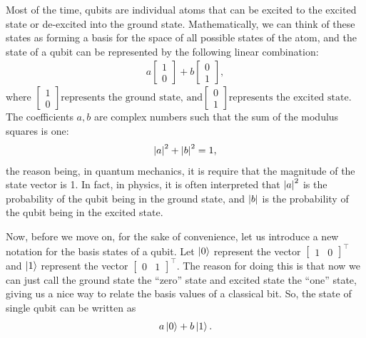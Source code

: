 \documentclass[a4paper,11pt]{article}
\numberwithin{equation}{section}
\theoremstyle{definition}
\begin{document}
Most of the time, qubits are individual atoms that can be excited to the excited state or de-excited into the ground state. Mathematically, we can think of these states as forming a basis for the space of all possible states of the atom, and the state of a qubit can be represented by the following linear combination:
\begin{align*}
a\begin{bmatrix}
1\\0
\end{bmatrix}
+
b\begin{bmatrix}
0\\1
\end{bmatrix},
\end{align*} 
where 
$
\begin{bmatrix}
1\\0
\end{bmatrix} \text{represents the ground state, and}
\begin{bmatrix}
0\\1
\end{bmatrix} \text{represents the excited state}
$. The coefficients $a,b$ are complex numbers such that the sum of the modulus squares is one:
\begin{align*}
\abs{a}^2 + \abs{b}^2 = 1,
\end{align*}
the reason being, in quantum mechanics, it is require that the magnitude of the state vector is 1. In fact, in physics, it is often interpreted that $\abs{a}^2$ is the probability of the qubit being in the ground state, and $\abs{b}$ is the probability of the qubit being in the excited state. 

Now, before we move on, for the sake of convenience, let us introduce a new notation for the basis states of a qubit. Let $\left\vert{0}\right\rangle$ represent the vector $\begin{bmatrix}
1 & 0
\end{bmatrix}^\top$ and $\left\vert{1}\right\rangle$ represent the vector $\begin{bmatrix}
0&1
\end{bmatrix}^\top$. The reason for doing this is that now we can just call the ground state the ``zero'' state and excited state the ``one'' state, giving us a nice way to relate the basis values of a classical bit. So, the state of single qubit can be  written as
\begin{align*}
a\left\vert{0}\right\rangle + b\left\vert{1}\right\rangle.
\end{align*}
\end{document}
